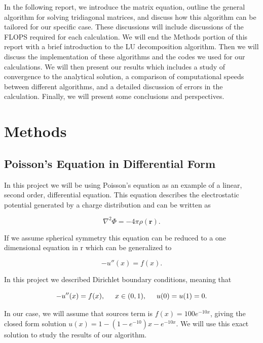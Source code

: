 \documentclass[%
oneside,                 %
final,                   %
10pt]{article}
\begin{document}
In the following report, we introduce the matrix equation, outline the general algorithm for solving tridiagonal matrices, and discuss how this algorithm can be tailored for our specific case.  These discussions will include discussions of the FLOPS required for each calculation.  We will end the Methods portion of this report with a brief introduction to the LU decomposition algorithm.  Then we will discuss the implementation of these algorithms and the codes we used for our calculations.  We will then present our results which includes a study of convergence to the analytical solution, a comparison of computational speeds between different algorithms, and a detailed discussion of errors in the calculation.   Finally, we will present some conclusions and perspectives. 

\section{Methods}

\subsection{Poisson's Equation in Differential Form}

In this project we will be using Poisson's equation as an example of a linear, second order, differential equation.  This equation describes the electrostatic potential generated by a charge distribution and can be written as 

\begin{equation*}
\nabla^2 \Phi = -4\pi \rho (\mathbf{r}).
\end{equation*}

If we assume spherical symmetry this equation can be reduced to a one dimensional equation in r which can be generalized to 

\begin{equation*}
-u''(x) = f(x).
\end{equation*}

In this project we described Dirichlet boundary conditions, meaning that 

\begin{equation*}
-u''(x) = f(x), \hspace{0.5cm} x\in(0,1), \hspace{0.5cm} u(0) = u(1) = 0.
\end{equation*}

In our case, we will assume that sources term is $f(x) = 100e^{-10x}$, giving the closed form solution  $u(x) = 1-(1-e^{-10})x-e^{-10x}$.  We will use this exact solution to study the results of our algorithm.
\end{document}
